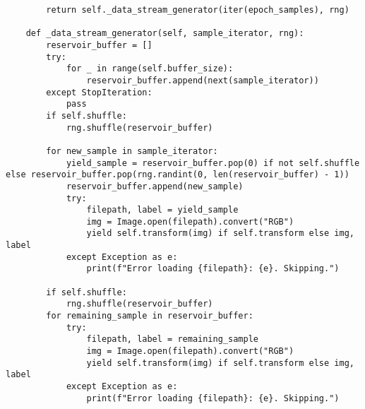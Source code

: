 \begin{lstlisting}
        return self._data_stream_generator(iter(epoch_samples), rng)

    def _data_stream_generator(self, sample_iterator, rng):
        reservoir_buffer = []
        try:
            for _ in range(self.buffer_size):
                reservoir_buffer.append(next(sample_iterator))
        except StopIteration:
            pass
        if self.shuffle:
            rng.shuffle(reservoir_buffer)
        
        for new_sample in sample_iterator:
            yield_sample = reservoir_buffer.pop(0) if not self.shuffle else reservoir_buffer.pop(rng.randint(0, len(reservoir_buffer) - 1))
            reservoir_buffer.append(new_sample)
            try:
                filepath, label = yield_sample
                img = Image.open(filepath).convert("RGB")
                yield self.transform(img) if self.transform else img, label
            except Exception as e:
                print(f"Error loading {filepath}: {e}. Skipping.")

        if self.shuffle:
            rng.shuffle(reservoir_buffer)
        for remaining_sample in reservoir_buffer:
            try:
                filepath, label = remaining_sample
                img = Image.open(filepath).convert("RGB")
                yield self.transform(img) if self.transform else img, label
            except Exception as e:
                print(f"Error loading {filepath}: {e}. Skipping.")
\end{lstlisting}


